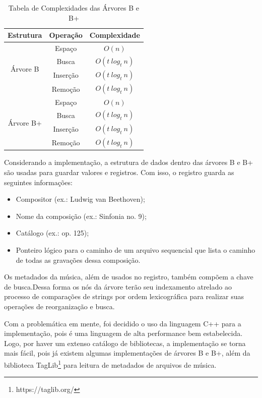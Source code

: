 \documentclass[12pt]{article}
\begin{document}
\begin{table}[ht]
\centering
\caption{Tabela de Complexidades das Árvores B e B\nolinebreak+}
\label{tab:complexidades}
\begin{tabular}{|c|c|c|}
\hline
  Estrutura & Operação & Complexidade \\ \hline
  \multirow{4}{*}{Árvore B} & Espaço & $O(n)$ \\ \cline{2-3} & Busca & $O(t\
  log_t\ n)$ \\ \cline{2-3} & Inserção & $O(t\ log_t\ n)$\\ \cline{2-3} &
  Remoção & $O(t\ log_t\ n)$ \\
  \hline
  \multirow{4}{*}{Árvore B\nolinebreak+} & Espaço & $O(n)$ \\ \cline{2-3} &
  Busca & $O(t\ log_t\ n)$ \\ \cline{2-3} & Inserção & $O(t\ log_t\ n)$\\
  \cline{2-3} & Remoção & $O(t\ log_t\ n)$\\
  \hline
\end{tabular}
\end{table}

Considerando a implementação, a estrutura de dados dentro das árvores B e
B\nolinebreak+ são usadas para guardar valores e registros. Com isso, o registro
guarda as seguintes informações:
\begin{itemize}
  \item Compositor (ex.: Ludwig van Beethoven);
  \item Nome da composição (ex.: Sinfonia no. 9);
  \item Catálogo (ex.: op. 125);
  \item Ponteiro lógico para o caminho de um arquivo sequencial que lista o
    caminho de todas as gravações dessa composição.
\end{itemize}

Os metadados da música, além de usados no registro, também compõem a chave de
busca.Dessa forma os nós da árvore terão seu indexamento atrelado ao processo de
comparações de strings por ordem lexicográfica para realizar suas operações de
reorganização e busca.

Com a problemática em mente, foi decidido o uso da linguagem C++ para a
implementação, pois é uma linguagem de alta performance bem estabelecida. Logo,
por haver um extenso catálogo de bibliotecas, a implementação se torna mais
fácil, pois já existem algumas implementações de árvores B e B\nolinebreak+,
além da biblioteca TagLib\footnote{https://taglib.org/} para leitura de
metadados de arquivos de música.
\end{document}
